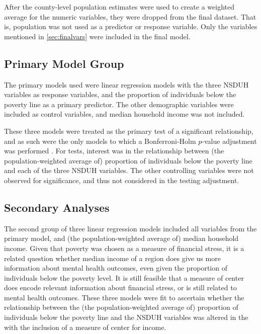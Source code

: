 \documentclass{article}
\begin{document}
After the county-level population estimates were used
to create a weighted average for the numeric variables,
they were dropped from the final dataset.
That is, population was not used as a predictor or response variable.
Only the variables mentioned in \ref{sec:finalvars}
were included in the final model.



\subsection{Primary Model Group}

The primary models used were linear regression models with the three NSDUH
variables as response variables, and
the proportion of individuals below the poverty line as a primary predictor.
The other demographic variables were included as control variables,
and median household income was not included.

These three models were treated as the primary test
of a significant relationship,
and as such were the only models to which a Bonferroni-Holm
$p$-value adjustment was performed \cite{holm}.
For tests, interest was in the relationship between
(the population-weighted average of)
proportion of individuals below the poverty line
and each of the three NSDUH variables.
The other controlling variables were not
observed for significance,
and thus not considered in the testing adjustment.


\subsection{Secondary Analyses}

The second group of three linear regression models included all variables
from the primary model,
and
(the population-weighted average of)
median household income.
Given that poverty was chosen as a measure of financial stress,
it is a related question whether
median income of a region does give us more information about mental
health outcomes, even given the proportion of individuals below the
poverty level. It is still feasible that a measure of center does encode
relevant information about financial stress, or is still related to
mental health outcomes.
These three models were fit to ascertain whether
the relationship between the
(the population-weighted average of)
proportion of individuals below the poverty line
and the NSDUH variables was altered in the
with the inclusion of a measure of center for income.
\end{document}
